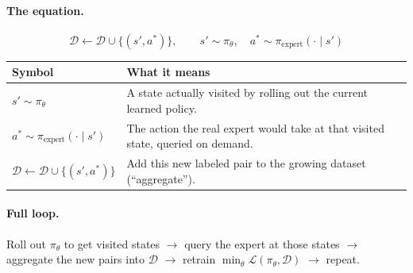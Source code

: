 \documentclass[11pt]{article}
\begin{document}
\paragraph{The equation.}
$$\mathcal{D} \leftarrow \mathcal{D} \cup \{(s', a^*)\}, \qquad s' \sim \pi_\theta,\quad
a^* \sim \pi_{\text{expert}}(\cdot\mid s')$$

\begin{center}
\begin{tabular}{@{}p{3.2cm}p{10.3cm}@{}}
\toprule
Symbol & What it means \\
\midrule
$s' \sim \pi_\theta$ & A state actually visited by rolling out the current learned
policy. \\
$a^* \sim \pi_{\text{expert}}(\cdot\mid s')$ & The action the real expert would take at
that visited state, queried on demand. \\
$\mathcal{D} \leftarrow \mathcal{D}\cup\{(s',a^*)\}$ & Add this new labeled pair to the
growing dataset (``aggregate''). \\
\bottomrule
\end{tabular}
\end{center}

\paragraph{Full loop.}
Roll out $\pi_\theta$ to get visited states $\to$ query the expert at those states $\to$
aggregate the new pairs into $\mathcal{D}$ $\to$ retrain $\min_\theta \mathcal{L}(\pi_\theta,\mathcal{D})$
$\to$ repeat.
\end{document}
